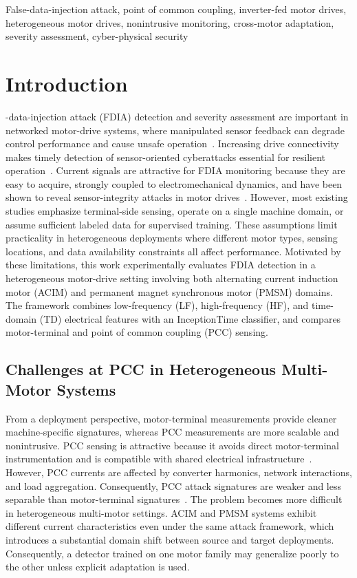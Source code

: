 \documentclass[letterpaper,journal]{IEEEtran}
\begin{document}
\begin{IEEEkeywords}
False-data-injection attack, point of common coupling, inverter-fed motor drives, heterogeneous motor drives, nonintrusive monitoring, cross-motor adaptation, severity assessment, cyber-physical security
\end{IEEEkeywords}

\section{Introduction}
\label{sec:introduction}

-data-injection attack (FDIA) detection and severity assessment are important in networked motor-drive systems, where manipulated sensor feedback can degrade control performance and cause unsafe operation~\cite{Ghaderi2021A}. Increasing drive connectivity makes timely detection of sensor-oriented cyberattacks essential for resilient operation~\cite{Yang2022Fast,Yang2024Enhanced}.
Current signals are attractive for FDIA monitoring because they are easy to acquire, strongly coupled to electromechanical dynamics, and have been shown to reveal sensor-integrity attacks in motor drives~\cite{7944701, YangVulnerability}. However, most existing studies emphasize terminal-side sensing, operate on a single machine domain, or assume sufficient labeled data for supervised training. These assumptions limit practicality in heterogeneous deployments where different motor types, sensing locations, and data availability constraints all affect performance.
Motivated by these limitations, this work experimentally evaluates FDIA detection in a heterogeneous motor-drive setting involving both alternating current induction motor (ACIM) and permanent magnet synchronous motor (PMSM) domains. The framework combines low-frequency (LF), high-frequency (HF), and time-domain (TD) electrical features with an InceptionTime classifier, and compares motor-terminal and point of common coupling (PCC) sensing.

\subsection{Challenges at PCC in Heterogeneous Multi-Motor Systems}
\label{sec:pcc_challenges}

From a deployment perspective, motor-terminal measurements provide cleaner machine-specific signatures, whereas PCC measurements are more scalable and nonintrusive. PCC sensing is attractive because it avoids direct motor-terminal instrumentation and is compatible with shared electrical infrastructure~\cite{7271086}. However, PCC currents are affected by converter harmonics, network interactions, and load aggregation. Consequently, PCC attack signatures are weaker and less separable than motor-terminal signatures~\cite{10005067}.
The problem becomes more difficult in heterogeneous multi-motor settings. ACIM and PMSM systems exhibit different current characteristics even under the same attack framework, which introduces a substantial domain shift between source and target deployments. Consequently, a detector trained on one motor family may generalize poorly to the other unless explicit adaptation is used.
\end{document}
